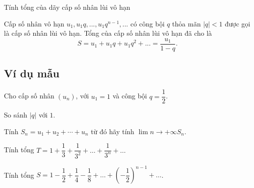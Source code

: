 

\begin{dang}{Tính tổng của dãy cấp số nhân lùi vô hạn}
		\begin{dn}
		Cấp số nhân vô hạn $u_1, u_1q,...,u_1q^{n-1},...$ có công bội $q$ thỏa mãn $|q|<1$ được gọi là cấp số nhân lùi vô hạn. 
		Tổng của cấp số nhân lùi vô hạn đã cho là $$S=u_1+u_1q+u_1q^2+...=\dfrac{u_1}{1-q}.$$
	\end{dn}
\end{dang}
\subsection*{Ví dụ mẫu}
\begin{vd}%
	Cho cấp số nhân $(u_n)$, với $u_1=1$ và công bội $q=\dfrac{1}{2}$.
	\begin{enumEX}{1}
		\item So sánh $\left|q\right|$ với $1$.
		\item Tính $S_n=u_1+u_2+\cdots+u_n$ từ đó hãy tính $\lim \limits{n \to +\infty}S_n$.
	\end{enumEX}
\end{vd}
\begin{vd}%
	Tính tổng $T=1+\dfrac{1}{3}+\dfrac{1}{3^2}+\ldots+\dfrac{1}{3^n}+\ldots$
\end{vd}
\begin{vd}
	Tính tổng $S=1-\dfrac{1}{2}+\dfrac{1}{4}-\dfrac{1}{8}+\ldots+\left(-\dfrac{1}{2}\right)^{n-1}+\ldots$.
\end{vd}

